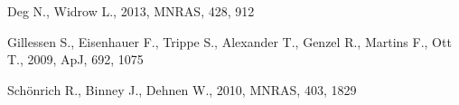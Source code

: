 Deg N., Widrow L., 2013, MNRAS, 428, 912 

Gillessen S., Eisenhauer F., Trippe S., Alexander T., Genzel R., Martins F., Ott T., 2009, ApJ, 692, 1075 

Sch{\"o}nrich R., Binney J., Dehnen W., 2010, MNRAS, 403, 1829 

